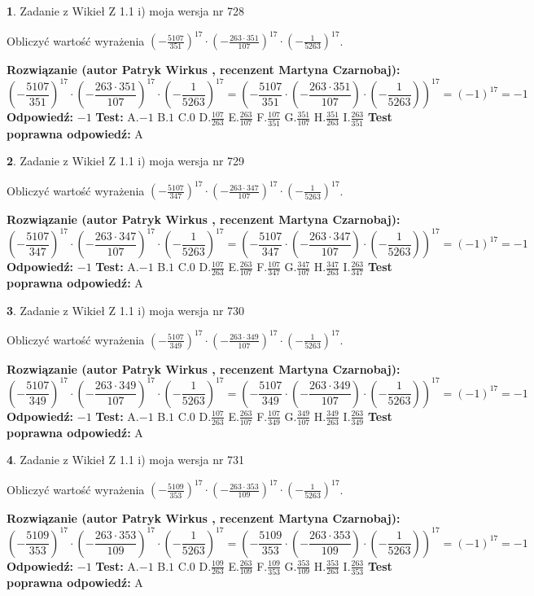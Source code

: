\documentclass[12pt, a4paper]{article}
\theoremstyle{definition} %
\newtheorem{zad}{}
\newcommand{\zadStart}[1]{\begin{zad}#1\newline}
\newcommand{\zadStop}{\end{zad}}
\newcommand{\rozwStart}[2]{\noindent \textbf{Rozwiązanie (autor #1 , recenzent #2): }\newline}
\newcommand{\rozwStop}{\newline}
\newcommand{\odpStart}{\noindent \textbf{Odpowiedź:}\newline}
\newcommand{\odpStop}{\newline}
\newcommand{\testStart}{\noindent \textbf{Test:}\newline}
\newcommand{\testStop}{\newline}
\newcommand{\kluczStart}{\noindent \textbf{Test poprawna odpowiedź:}\newline}
\newcommand{\kluczStop}{\newline}
\begin{document}
\zadStart{Zadanie z Wikieł Z 1.1 i) moja wersja nr 728}

Obliczyć wartość wyrażenia $(-\frac{5107}{351})^{17} \cdot (-\frac{263 \cdot 351}{107})^{17} \cdot (-\frac{1}{5263})^{17}$.
\zadStop
\rozwStart{Patryk Wirkus}{Martyna Czarnobaj}
$$(-\frac{5107}{351})^{17} \cdot (-\frac{263 \cdot 351}{107})^{17} \cdot (-\frac{1}{5263})^{17} = (-\frac{5107}{351} \cdot (-\frac{263 \cdot 351}{107}) \cdot (-\frac{1}{5263}))^{17} = (-1)^{17} = -1$$
\rozwStop
\odpStart
$-1$
\odpStop
\testStart
A.$-1$ B.$1$ C.$0$ D.$\frac{107}{263}$ E.$\frac{263}{107}$
F.$\frac{107}{351}$ G.$\frac{351}{107}$
H.$\frac{351}{263}$
I.$\frac{263}{351}$
\testStop
\kluczStart
A
\kluczStop



\zadStart{Zadanie z Wikieł Z 1.1 i) moja wersja nr 729}

Obliczyć wartość wyrażenia $(-\frac{5107}{347})^{17} \cdot (-\frac{263 \cdot 347}{107})^{17} \cdot (-\frac{1}{5263})^{17}$.
\zadStop
\rozwStart{Patryk Wirkus}{Martyna Czarnobaj}
$$(-\frac{5107}{347})^{17} \cdot (-\frac{263 \cdot 347}{107})^{17} \cdot (-\frac{1}{5263})^{17} = (-\frac{5107}{347} \cdot (-\frac{263 \cdot 347}{107}) \cdot (-\frac{1}{5263}))^{17} = (-1)^{17} = -1$$
\rozwStop
\odpStart
$-1$
\odpStop
\testStart
A.$-1$ B.$1$ C.$0$ D.$\frac{107}{263}$ E.$\frac{263}{107}$
F.$\frac{107}{347}$ G.$\frac{347}{107}$
H.$\frac{347}{263}$
I.$\frac{263}{347}$
\testStop
\kluczStart
A
\kluczStop



\zadStart{Zadanie z Wikieł Z 1.1 i) moja wersja nr 730}

Obliczyć wartość wyrażenia $(-\frac{5107}{349})^{17} \cdot (-\frac{263 \cdot 349}{107})^{17} \cdot (-\frac{1}{5263})^{17}$.
\zadStop
\rozwStart{Patryk Wirkus}{Martyna Czarnobaj}
$$(-\frac{5107}{349})^{17} \cdot (-\frac{263 \cdot 349}{107})^{17} \cdot (-\frac{1}{5263})^{17} = (-\frac{5107}{349} \cdot (-\frac{263 \cdot 349}{107}) \cdot (-\frac{1}{5263}))^{17} = (-1)^{17} = -1$$
\rozwStop
\odpStart
$-1$
\odpStop
\testStart
A.$-1$ B.$1$ C.$0$ D.$\frac{107}{263}$ E.$\frac{263}{107}$
F.$\frac{107}{349}$ G.$\frac{349}{107}$
H.$\frac{349}{263}$
I.$\frac{263}{349}$
\testStop
\kluczStart
A
\kluczStop



\zadStart{Zadanie z Wikieł Z 1.1 i) moja wersja nr 731}

Obliczyć wartość wyrażenia $(-\frac{5109}{353})^{17} \cdot (-\frac{263 \cdot 353}{109})^{17} \cdot (-\frac{1}{5263})^{17}$.
\zadStop
\rozwStart{Patryk Wirkus}{Martyna Czarnobaj}
$$(-\frac{5109}{353})^{17} \cdot (-\frac{263 \cdot 353}{109})^{17} \cdot (-\frac{1}{5263})^{17} = (-\frac{5109}{353} \cdot (-\frac{263 \cdot 353}{109}) \cdot (-\frac{1}{5263}))^{17} = (-1)^{17} = -1$$
\rozwStop
\odpStart
$-1$
\odpStop
\testStart
A.$-1$ B.$1$ C.$0$ D.$\frac{109}{263}$ E.$\frac{263}{109}$
F.$\frac{109}{353}$ G.$\frac{353}{109}$
H.$\frac{353}{263}$
I.$\frac{263}{353}$
\testStop
\kluczStart
A
\kluczStop
\end{document}
